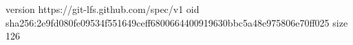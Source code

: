 version https://git-lfs.github.com/spec/v1
oid sha256:2e9fd080fe09534f551649ceff6800664400919630bbc5a48e975806e70ff025
size 126
